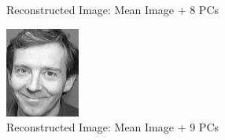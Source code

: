 \documentclass[12pt]{article}
\begin{document}
\begin{figure}
\begin{subfigure}[b]{0.20\textwidth}
		\caption{Reconstructed Image: Mean Image + 8 PCs}
	\end{subfigure}\quad
	\begin{subfigure}[b]{0.20\textwidth}
		\includegraphics[width=\textwidth]{Task4.3_Images/ReconstructedImage9.jpg}
		\caption{Reconstructed Image: Mean Image + 9 PCs}
	\end{subfigure}\quad
\begin{subfigure}[b]{0.20\textwidth}

\end{subfigure}
\end{figure}
\end{document}
